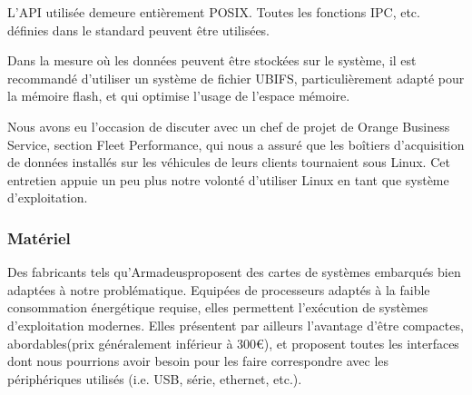 
L'API utilisée demeure entièrement POSIX\footnotemark. Toutes les fonctions IPC, etc. définies dans le standard peuvent être utilisées\footnotemark.



Dans la mesure où les données peuvent être stockées sur le système, il est recommandé d'utiliser un système de fichier UBIFS\footnotemark, particulièrement adapté pour la mémoire flash, et qui optimise l'usage de l'espace mémoire.


Nous avons eu l'occasion de discuter avec un chef de projet de Orange Business Service, section Fleet Performance, qui nous a assuré que les boîtiers d'acquisition de données installés sur les véhicules de leurs clients tournaient sous Linux. Cet entretien appuie un peu plus notre volonté d'utiliser Linux en tant que système d'exploitation.

\subsubsection{Matériel}

Des fabricants tels qu'Armadeus\footnotemark proposent des cartes de systèmes embarqués bien adaptées à notre problématique. Equipées de processeurs adaptés à la faible consommation énergétique requise, elles permettent l'exécution de systèmes d'exploitation modernes. Elles présentent par ailleurs l'avantage d'être compactes, abordables\footnotemark (prix généralement inférieur à 300\euro ), et proposent toutes les interfaces dont nous pourrions avoir besoin pour les faire correspondre avec les périphériques utilisés (i.e. USB, série, ethernet, etc.).


